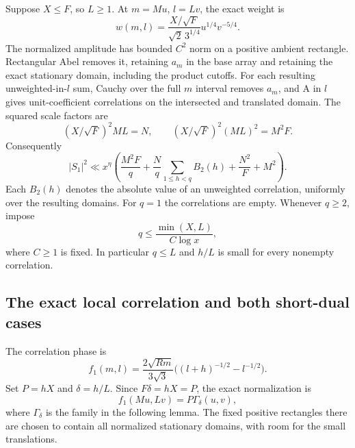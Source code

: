 \documentclass[11pt,a4paper]{article}
\numberwithin{equation}{section}
\theoremstyle{remark}
\begin{document}
Suppose $X\le F$, so $L\ge1$. At $m=Mu$, $l=Lv$, the exact weight is
\[
 w(m,l)=\frac{X/\sqrt F}{\sqrt2\,3^{1/4}}u^{1/4}v^{-5/4}.
\]
The normalized amplitude has bounded $C^2$ norm on a positive ambient
rectangle. Rectangular Abel removes it, retaining $a_m$ in the base array
and retaining the exact stationary domain, including the product cutoffs.
For each resulting unweighted-in-$l$ sum, Cauchy over the full $m$ interval
removes $a_m$, and A in $l$ gives unit-coefficient correlations on the
intersected and translated domain. The squared scale factors are
\[
 (X/\sqrt F)^2ML=N,\qquad
 (X/\sqrt F)^2(ML)^2=M^2F.
\]
Consequently
\begin{equation}\label{eq:caseB-A}
 |S_1|^2\ll x^\eta\left(
 \frac{M^2F}{q}+\frac Nq\sum_{1\le h<q}B_2(h)
          +\frac{N^2}{F}+M^2\right).
\end{equation}
Each $B_2(h)$ denotes the absolute value of an unweighted correlation,
uniformly over the resulting domains. For $q=1$ the correlations are
empty. Whenever $q\ge2$, impose
\begin{equation}\label{eq:caseB-cap}
 q\le\frac{\min(X,L)}{C\log x},
\end{equation}
where $C\ge1$ is fixed. In particular $q\le L$ and $h/L$ is small for
every nonempty correlation.

\subsection{The exact local correlation and both short-dual cases}
The correlation phase is
\begin{equation}\label{eq:caseB-correlation}
 f_1(m,l)=\frac{2\sqrt{Rm}}{3\sqrt3}
          \bigl((l+h)^{-1/2}-l^{-1/2}\bigr).
\end{equation}
Set $P=hX$ and $\delta=h/L$. Since $F\delta=hX=P$, the exact
normalization is
\[
 f_1(Mu,Lv)=P\Gamma_\delta(u,v),
\]
where $\Gamma_\delta$ is the family in the following lemma. The fixed
positive rectangles there are chosen to contain all normalized stationary
domains, with room for the small translations.
\end{document}
